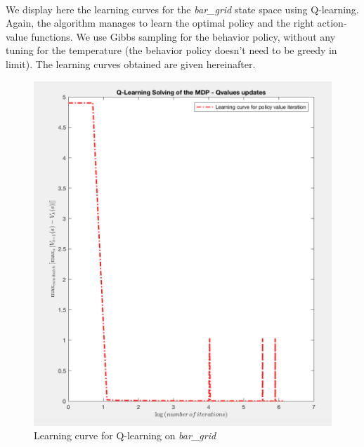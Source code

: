 \documentclass[a4paper]{report}
\begin{document}
{{{				\paragraph{} We display here the learning curves for the \emph{bar\_grid} state space using Q-learning. Again, the algorithm manages to learn the optimal policy and the right action-value functions. We use Gibbs sampling for the behavior policy, without any tuning for the temperature (the behavior policy doesn't need to be greedy in limit). The learning curves obtained are given hereinafter.
				\begin{figure}[h!]
					\begin{minipage}{0.4\linewidth}
						\includegraphics[width=\linewidth]{bargrid_ql_learning_curve}
						\caption{Learning curve for Q-learning on \emph{bar\_grid}}
					\end{minipage}
					\hfill
					\begin{minipage}{0.4\linewidth}

\end{minipage}
\end{figure}}}}
\end{document}
